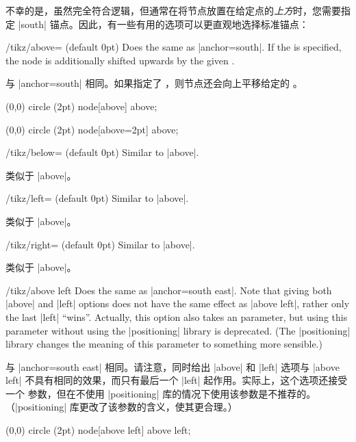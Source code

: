 不幸的是，虽然完全符合逻辑，但通常在将节点放置在给定点的\emph{上方}时，您需要指定 |south| 锚点。因此，有一些有用的选项可以更直观地选择标准锚点：

\begin{key}{/tikz/above= (default 0pt)}
    Does the same as |anchor=south|. If the  is specified, the
    node is additionally shifted upwards by the given .
    
    与 |anchor=south| 相同。如果指定了 ，则节点还会向上平移给定的 。

\begin{codeexample}[]
\tikz \fill (0,0) circle (2pt) node[above] {above};
\end{codeexample}
\begin{codeexample}[]
\tikz \fill (0,0) circle (2pt) node[above=2pt] {above};
\end{codeexample}
\end{key}

\begin{key}{/tikz/below= (default 0pt)}
    Similar to |above|.

    类似于 |above|。


\end{key}

\begin{key}{/tikz/left= (default 0pt)}
    Similar to |above|.

    类似于 |above|。


\end{key}

\begin{key}{/tikz/right= (default 0pt)}
    Similar to |above|.

    类似于 |above|。


\end{key}

\begin{key}{/tikz/above left}
    Does the same as |anchor=south east|. Note that giving both |above| and
    |left| options does not have the same effect as |above left|, rather only
    the last |left| ``wins''. Actually, this option also takes an 
    parameter, but using this parameter without using the |positioning| library
    is deprecated. (The |positioning| library changes the meaning of this
    parameter to something more sensible.)
    
    与 |anchor=south east| 相同。请注意，同时给出 |above| 和 |left| 选项与 |above left| 不具有相同的效果，而只有最后一个 |left| 起作用。实际上，这个选项还接受一个  参数，但在不使用 |positioning| 库的情况下使用该参数是不推荐的。（|positioning| 库更改了该参数的含义，使其更合理。）

\begin{codeexample}[]
\tikz \fill (0,0) circle (2pt) node[above left] {above left};
\end{codeexample}
\end{key}

